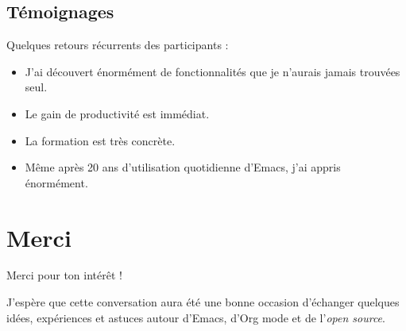 \documentclass{mcreport}
\begin{document}
\section{Témoignages}
\label{sec:orgdc631fa}

Quelques retours récurrents des participants :

\begin{itemize}
\item \og J'ai découvert énormément de fonctionnalités que je n'aurais jamais trouvées
seul.\fg{}
\item \og Le gain de productivité est immédiat.\fg{}
\item \og La formation est très concrète.\fg{}
\item \og Même après 20 ans d'utilisation quotidienne d'Emacs, j'ai appris énormément.\fg{}
\end{itemize}
\chapter{Merci}
\label{sec:orgdbe64e2}

Merci pour ton intérêt !

J'espère que cette conversation aura été une bonne occasion d'échanger quelques
idées, expériences et astuces autour d'Emacs, d'Org mode et de l'\emph{open source}.
\end{document}

